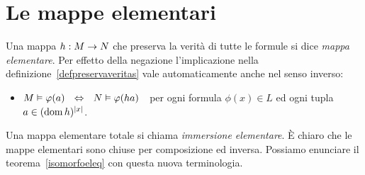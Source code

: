 \section{Le mappe elementari}\label{mappeelementari}
Una mappa $h:M\rightarrow N$ che preserva la verit\`a di tutte le formule si dice \emph{mappa elementare}. Per effetto della negazione l'implicazione nella definizione~\ref{defpreservaveritas} vale automaticamente anche nel senso inverso:
\begin{itemize}
\item[] $M\models\phi(a)\ \ \IFF\ \ N\models\phi(ha)$\ \  per ogni formula $\phi(x)\in L$ ed ogni tupla $a\in(\mathop{\rm dom} h)^{|x|}$.
\end{itemize}

Una mappa elementare totale si chiama \emph{immersione elementare}. \`E chiaro che le mappe elementari sono chiuse per composizione ed inversa. Possiamo enunciare il teorema~\ref{isomorfoeleq} con questa nuova terminologia.

